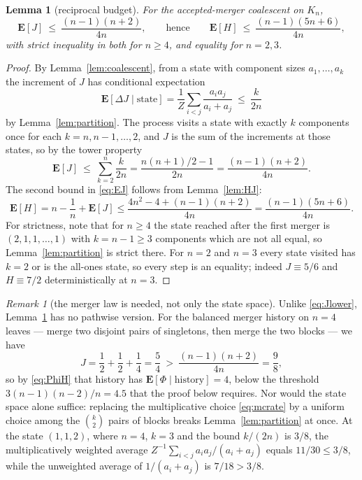 \documentclass[11pt,a4paper]{amsart}
\theoremstyle{plain}
\newtheorem{lemma}[theorem]{Lemma}
\theoremstyle{definition}
\theoremstyle{remark}
\newtheorem{remark}[theorem]{Remark}
\newcommand{\E}{\mathbf{E}}
\begin{document}
\begin{lemma}[reciprocal budget]
\label{lem:budget}
For the accepted-merger coalescent on $K_n$,
\begin{equation}
\label{eq:EJ}
\E[J]\ \le\ \frac{(n-1)(n+2)}{4n},
\qquad\text{hence}\qquad
\E[H]\ \le\ \frac{(n-1)(5n+6)}{4n},
\end{equation}
with strict inequality in both for $n\ge4$, and equality for $n=2,3$.
\end{lemma}

\begin{proof}
By Lemma~\ref{lem:coalescent}, from a state with component sizes $a_1,\dots,a_k$
the increment of $J$ has conditional expectation
\[
\E[\Delta J\mid \text{state}]=\frac1Z\sum_{i<j}\frac{a_ia_j}{a_i+a_j}
\ \le\ \frac{k}{2n}
\]
by Lemma~\ref{lem:partition}. The process visits a state with exactly $k$
components once for each $k=n,n-1,\dots,2$, and $J$ is the sum of the increments
at those states, so by the tower property
\[
\E[J]\ \le\ \sum_{k=2}^n\frac k{2n}=\frac{n(n+1)/2-1}{2n}=\frac{(n-1)(n+2)}{4n} .
\]
The second bound in \eqref{eq:EJ} follows from Lemma~\ref{lem:HJ}:
\[
\E[H]=n-\frac1n+\E[J]\le\frac{4n^2-4+(n-1)(n+2)}{4n}=\frac{(n-1)(5n+6)}{4n} .
\]
For strictness, note that for $n\ge4$ the state reached after the first merger is
$(2,1,1,\dots,1)$ with $k=n-1\ge3$ components which are not all equal, so
Lemma~\ref{lem:partition} is strict there. For $n=2$ and $n=3$ every state
visited has $k=2$ or is the all-ones state, so every step is an equality; indeed
$J\equiv5/6$ and $H\equiv7/2$ deterministically at $n=3$.
\end{proof}

\begin{remark}[the merger law is needed, not only the state space]
\label{rem:notpathwise}
Unlike \eqref{eq:Jlower}, Lemma~\ref{lem:budget} has no pathwise version. For the
balanced merger history on $n=4$ leaves --- merge two disjoint pairs of
singletons, then merge the two blocks --- we have
\[
J=\frac12+\frac12+\frac14=\frac54\ >\ \frac{(n-1)(n+2)}{4n}=\frac98,
\]
so by \eqref{eq:PhiH} that history has $\E[\Phi\mid\text{history}]=4$, below the
threshold $3(n-1)(n-2)/n=4.5$ that the proof below requires. Nor would the state
space alone suffice: replacing the multiplicative choice \eqref{eq:mcrate} by a
uniform choice among the $\binom k2$ pairs of blocks breaks
Lemma~\ref{lem:partition} at once. At the state $(1,1,2)$, where $n=4$, $k=3$
and the bound $k/(2n)$ is $3/8$, the multiplicatively weighted average
$Z^{-1}\sum_{i<j}a_ia_j/(a_i+a_j)$ equals $11/30\le3/8$, while the unweighted
average of $1/(a_i+a_j)$ is $7/18>3/8$.
\end{remark}
\end{document}
